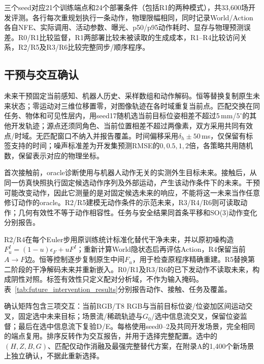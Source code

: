 三个seed对应21个训练端点和24个部署条件（包括R1的两种模式），共33,600场开发评测。各行每次重规划执行一条动作，物理限幅相同，同时记录World/Action各自NFE、实际调用、活动参数、曝光、p50/p95动作耗时、显存与物理预测误差。R0/R1比较监督，R1两部署比较未被读取的生成成本，R1--R4比较访问关系，R2/R5及R3/R6比较完整同步/顺序程序。



\subsection{干预与交互确认}
\label{app:design_crosschecks}
未来干预固定当前感知、机器人历史、采样数组和动作解码。恒等替换复制原生未来状态；零运动对三维位移置零，对图像轨迹在各时域重复当前点。匹配交换在同任务、物体和可见性层内，用seed17随机选当前目标位姿相差不超过5\,mm/$5^\circ$的其他开发轨迹；源点还须同角色、当前位置相差不超过两像素，双方采用共同有效点/时域。无匹配窗口不纳入并报告覆盖。时间偏移采用$\delta_h\pm50$\,ms，仅保留有标签支持的时间；噪声标准差为开发集预测RMSE的$0,0.5,1,2$倍，各策略共用随机数，保留表示对应的物理坐标。

首次接触前，oracle诊断使用与机器人动作无关的实测外生目标未来。接触后，从同一仿真快照执行固定候选动作序列及外部运动，产生该动作条件下的未来。干预可能改变动作，因此它测量的是对固定候选未来的响应，不能将这一未来当作任意修订动作的oracle。R2/R5建模无动作条件的示范未来，R3/R4/R6则可读取动作；几何有效性不等于动作相容性。任务与安全结果同首条平移和SO(3)动作变化分别报告。

R2/R4在每个Euler步用原训练统计标准化替代干净未来，并以原初噪构造$F_u^I=(1-u)\epsilon_F+uF^I$；重新计算World隐状态后再评估Action，R4保留当前$A\to F$边。恒等控制逐步复制原生中间$F_u$，用于检查原程序精确重建。R5替换第二阶段的干净解码未来并重新嵌入。R0/R1及R3/R6的已下发动作不读取未来，构成阴性对照。标签有效性只定义配对分析域，不作为输入掩码。表~\ref{tab:future_intervention_results}分别报告动作、接触、任务及覆盖。



确认矩阵包含三项交互：当前RGB/T8 RGB与当前目标位姿/位姿加区间运动交叉，固定选中未来目标；场景流/稀疏轨迹与$G_0$/选中信息流交叉，保留位姿监督；最后在选中信息流下复验D/E。每格使用seed0--2及共同开发场景，完全相同的端点复用。排序反转作为交互报告，并用于选择完整配置。选中的$(H,Z,B,G)$、匹配仅动作消融及最强完整替代方案，在附录A的1,400个新场景上独立确认，不据此重新选择。



